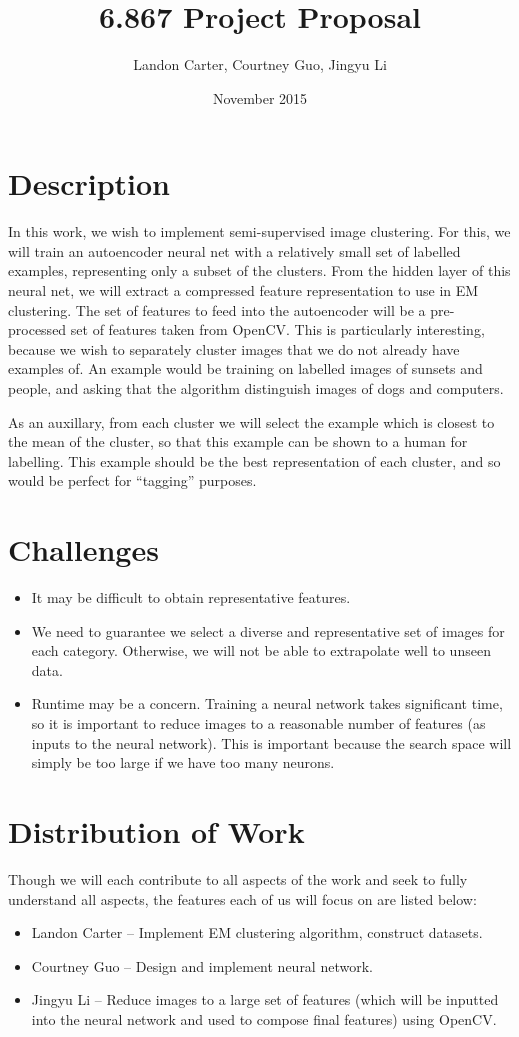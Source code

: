 \documentclass{article}
\title{6.867 Project Proposal}
\author{ Landon Carter, Courtney Guo, Jingyu Li }
\date{November 2015}
\begin{document}
\maketitle

\section{Description}
In this work, we wish to implement semi-supervised image clustering. For this, we will train an autoencoder neural net with a relatively small set of labelled examples, representing only a subset of the clusters. From the hidden layer of this neural net, we will extract a compressed feature representation to use in EM clustering. The set of features to feed into the autoencoder will be a pre-processed set of features taken from OpenCV. This is particularly interesting, because we wish to separately cluster images that we do not already have examples of. An example would be training on labelled images of sunsets and people, and asking that the algorithm distinguish images of dogs and computers.

As an auxillary, from each cluster we will select the example which is closest to the mean of the cluster, so that this example can be shown to a human for labelling. This example should be the best representation of each cluster, and so would be perfect for ``tagging'' purposes.
\section{Challenges}
\begin{itemize}
\item It may be difficult to obtain representative features. 
\item We need to guarantee we select a diverse and representative set of images for each category. Otherwise, we will not be able to extrapolate well to unseen data.
\item Runtime may be a concern. Training a neural network takes significant time, so it is important to reduce images to a reasonable number of features (as inputs to the neural network). This is important because the search space will simply be too large if we have too many neurons. 
\end{itemize}

\section{Distribution of Work}
Though we will each contribute to all aspects of the work and seek to fully understand all aspects, the features each of us will focus on are listed below:
\begin{itemize}
\item Landon Carter -- Implement EM clustering algorithm, construct datasets.
\item Courtney Guo -- Design and implement neural network.
\item Jingyu Li -- Reduce images to a large set of features (which will be inputted into the neural network and used to compose final features) using OpenCV.
\end{itemize}
\end{document}
